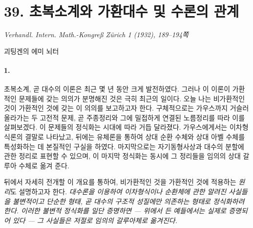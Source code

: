 
\section*{39. 초복소계와 가환대수 및 수론의 관계}

\begin{center}
\emph{Verhandl. Intern. Math.-Kongreß Zürich 1 (1932), 189--194쪽}
\end{center}

\begin{center}
\textsc{괴팅겐의 에미 뇌터}
\end{center}

\begingroup
\renewcommand{\thefootnote}{\arabic{footnote})}
\setcounter{footnote}{0}

\paragraph{1.}
초복소계, 곧 대수의 이론은 최근 몇 년 동안 크게 발전하였다. 그러나 이 이론이 가환적인 문제들에 갖는 의의가 분명해진 것은 극히 최근의 일이다. 오늘 나는 비가환적인 것이 가환적인 것에 갖는 이 의의를 보고하고자 한다. 구체적으로는 가우스까지 거슬러 올라가는 두 고전적 문제, 곧 주종정리와 그에 밀접하게 연결된 노름정리를 따라 이를 살펴보겠다. 이 문제들의 정식화는 시대에 따라 거듭 달라졌다. 가우스에게서는 이차형식론의 결말로 나타났고, 뒤에는 유체론을 통하여 상대 순환 수체와 상대 아벨 수체를 특성화하는 데 본질적인 구실을 하였다. 마지막으로는 자기동형사상과 대수의 분할에 관한 정리로 표현할 수 있으며, 이 마지막 정식화는 동시에 그 정리들을 임의의 상대 갈루아 수체로 옮겨 준다.

뒤에서 자세히 전개할 이 개요를 통하여, 비가환적인 것을 가환적인 것에 적용하는 \emph{원리}도 설명하고자 한다. \emph{대수론을 이용하여 이차형식이나 순환체에 관한 알려진 사실들을 불변적이고 단순한 형태, 곧 대수의 구조적 성질에만 의존하는 형태로 정식화하려 한다. 이러한 불변적 정식화를 일단 증명하면 --- 위에서 든 예들에서는 실제로 증명되어 있다 --- 그 사실들은 저절로 임의의 갈루아체로 옮겨진다.}

